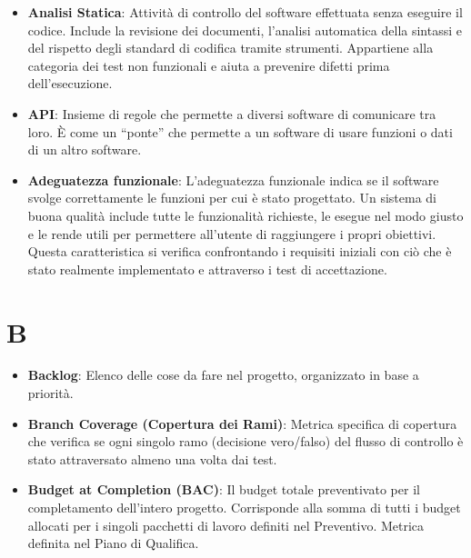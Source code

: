 \documentclass[11pt,a4paper]{article}
\begin{document}
\begin{itemize}
\item \textbf{Analisi Statica}: Attività di controllo del software effettuata senza eseguire il codice. Include la revisione dei documenti, l'analisi automatica della sintassi e del rispetto degli standard di codifica tramite strumenti. Appartiene alla categoria dei test non funzionali e aiuta a prevenire difetti prima dell'esecuzione.

\item \textbf{API}: Insieme di regole che permette a diversi software di comunicare tra loro. È come un “ponte” che permette a un software di usare funzioni o dati di un altro software.

\item \textbf{Adeguatezza funzionale}: L’adeguatezza funzionale indica se il software svolge correttamente le funzioni per cui è stato progettato. Un sistema di buona qualità include tutte le funzionalità richieste, le esegue nel modo giusto e le rende utili per permettere all’utente di raggiungere i propri obiettivi. Questa caratteristica si verifica confrontando i requisiti iniziali con ciò che è stato realmente implementato e attraverso i test di accettazione.


\end{itemize}
\newpage

\section*{B}
\begin{itemize}
\item \textbf{Backlog}: Elenco delle cose da fare nel progetto, organizzato in base a priorità.

\item \textbf{Branch Coverage (Copertura dei Rami)}: Metrica specifica di copertura che verifica se ogni singolo ramo (decisione vero/falso) del flusso di controllo è stato attraversato almeno una volta dai test.

\item \textbf{Budget at Completion (BAC)}: Il budget totale preventivato per il completamento dell'intero progetto. Corrisponde alla somma di tutti i budget allocati per i singoli pacchetti di lavoro definiti nel Preventivo. Metrica definita nel Piano di Qualifica.

\end{itemize}
\newpage
\end{document}
